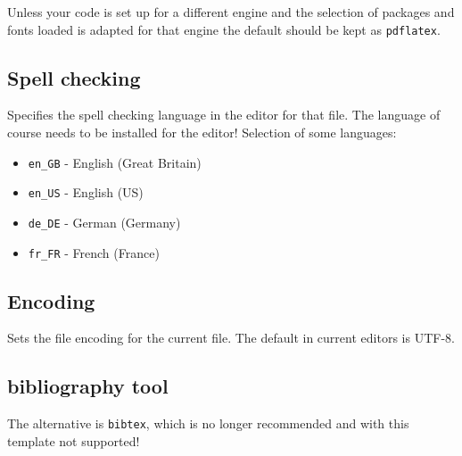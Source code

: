 Unless your code is set up for a different engine and the selection of packages and fonts loaded is adapted for that engine the default should be kept as \texttt{pdflatex}. 

\subsection{Spell checking}
\label{sec:doc:magiccomments:spell}

\begin{latexcode}
\end{latexcode}
%
Specifies the spell checking language in the editor for that file. 
The language of course needs to be installed for the editor!
%
Selection of some languages:
\begin{itemize}[noitemsep]
\item \texttt{en\_GB} - English (Great Britain)
\item \texttt{en\_US} - English (US)
\item \texttt{de\_DE} - German (Germany)
\item \texttt{fr\_FR} - French (France)
\end{itemize}

\subsection{Encoding}
\label{sec:doc:magiccomments:encoding}

\begin{latexcode}
\end{latexcode}
%
Sets the file encoding for the current file. The default in current editors is UTF-8.

\subsection{bibliography tool}
\label{sec:doc:magiccomments:bib}

\begin{latexcode}
\end{latexcode}
%
The alternative is \texttt{bibtex}, which is no longer recommended and with this template
not supported! 

